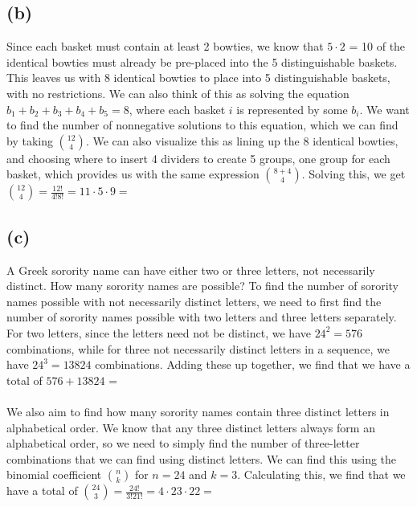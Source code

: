 \documentclass{article}
\begin{document}
{\subsection*{(b)}
Since each basket must contain at least 2 bowties, we know that $5 \cdot 2$ = 10 of the identical bowties must already be pre-placed into the 5 distinguishable baskets. This leaves us with 8 identical bowties to place into 5 distinguishable baskets, with no restrictions. We can also think of this as solving the equation $b_1 + b_2 + b_3 + b_4 + b_5 = 8$, where each basket $i$ is represented by some $b_i$. We want to find the number of nonnegative solutions to this equation, which we can find by taking $\binom{12}{4}$. We can also visualize this as lining up the 8 identical bowties, and choosing where to insert 4 dividers to create 5 groups, one group for each basket, which provides us with the same expression $\binom{8 + 4}{4}$. Solving this, we get \\
$\binom{12}{4} = \frac{12!}{4!8!} = 11 \cdot 5 \cdot 9 = $ 

\subsection*{(c)}
A Greek sorority name can have either two or three letters, not necessarily distinct. How many
sorority names are possible? 
To find the number of sorority names possible with not necessarily distinct letters, we need to first find the number of sorority names possible with two letters and three letters separately. For two letters, since the letters need not be distinct, we have $24^2 = 576$ combinations, while for three not necessarily distinct letters in a sequence, we have $24^3 = 13824$ combinations. Adding these up together, we find that we have a total of $576 + 13824$ =  \\ \\
We also aim to find how many sorority names contain three distinct letters in alphabetical
order. We know that any three distinct letters always form an alphabetical order, so we need to simply find the number of three-letter combinations that we can find using distinct letters. We can find this using the binomial coefficient $\binom{n}{k}$ for $n = 24$ and $k = 3$. Calculating this, we find that we have a total of $\binom{24}{3} = \frac{24!}{3!21!} = 4 \cdot 23 \cdot 22 = $ 

}
\end{document}
